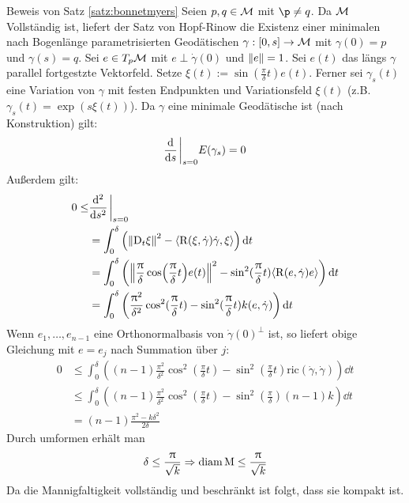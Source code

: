\begin{bew}{Beweis von Satz \ref{satz:bonnetmyers}}
Seien $p, q \in \mathcal{M}$ mit $\p \neq q$.
Da $\mathcal{M}$ Vollständig ist, liefert der Satz von Hopf-Rinow die Existenz einer minimalen
nach Bogenlänge parametrisierten Geodätischen $\gamma: [0 , s] \to \mathcal{M}$ 
mit $\gamma (0) =p$ und $\gamma (s) = q$.
Sei $e \in T_p \mathcal{M}$ mit $e \perp \dot{\gamma}(0)$ und $\norm{e}=1$.
Sei $e(t)$ das längs $\gamma$ parallel fortgestzte Vektorfeld.
Setze $\xi (t) := \sin (\frac{\pi}{\delta} t) e(t)$.
Ferner sei $\gamma_s (t)$ eine Variation von $\gamma$ mit festen Endpunkten und
Variationsfeld $\xi (t)$ (z.B. $\gamma_s (t) = \exp (s \xi (t))$).
Da $\gamma$ eine minimale Geodätische ist (nach Konstruktion) gilt:
\begin{align*}
    \dv{s} \eval_{s=0}E(\gamma_s) = 0 \\
\end{align*}
Außerdem gilt:
\begin{align*}
0 \leq & \dv[2]{s}\eval_{s=0} \\
&= \int^\delta_0 \left( \norm{\covd_t \xi}^2 - \langle \curv(\xi, \dot{\gamma}) \dot{\gamma}
, \xi \rangle \right) \dd t\\
&= \int^\delta_0 \left( \norm{ \frac{\pi}{\delta} \cos (\frac{\pi}{\delta} t) e(t) }^2
- \sin^2 (\frac{\pi}{\delta}t) \langle \curv (e, \dot{\gamma})e \rangle \right) \dd t \\
&= \int^\delta_0 \left( \frac{\pi^2}{\delta^2} \cos^2 (\frac{\pi}{\delta} t ) - 
\sin^2 (\frac{\pi}{\delta} t ) k (e, \dot{\gamma}) \right) \dd t
\end{align*}
Wenn $e_1, \dots, e_{n-1}$ eine Orthonormalbasis von $\dot{\gamma} (0)^\perp$ ist, 
so liefert obige Gleichung mit $e= e_j$ nach Summation über $j$:
\begin{align*}
0 &\leq \int^\delta_0 \left( (n-1) \frac{\pi^2}{\delta^2} 
    \cos^2 (\frac{\pi}{\delta} t) - \sin^2 (\frac{\pi}{\delta}t ) 
\text{ric}(\dot{\gamma}, \dot{\gamma}) \right) \dd t \\
&\leq \int^\delta_0 \left( (n-1) \frac{\pi^2}{\delta^2} \cos^2 (\frac{\pi}{\delta}t ) 
- \sin^2 (\frac{\pi}{\delta} ) (n-1)k \right) \dd t \\
&= (n-1) \frac{\pi^2 - k \delta^2}{2\delta}
\end{align*}
Durch umformen erhält man
\begin{align}
    \delta \leq \frac{\uppi}{\sqrt{k}} \Rightarrow \operatorname{diam} \mathrm{M} \leq \frac{\uppi}{\sqrt{k}}
\end{align}
Da die Mannigfaltigkeit vollständig und beschränkt ist folgt, dass sie kompakt ist.
\end{bew}
